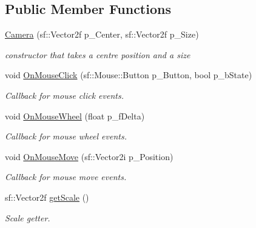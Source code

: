 \subsection*{Public Member Functions}
\begin{DoxyCompactItemize}
\item 
\mbox{\label{class_camera_a0c1efce0a93d56215af15a6bc88f360f}} 
\hyperlink{class_camera_a0c1efce0a93d56215af15a6bc88f360f}{Camera} (sf\+::\+Vector2f p\+\_\+\+Center, sf\+::\+Vector2f p\+\_\+\+Size)
\begin{DoxyCompactList}\small\item\em constructor that takes a centre position and a size \end{DoxyCompactList}\item 
\mbox{\label{class_camera_a58eedba9725c44625b3e983221aaf444}} 
void \hyperlink{class_camera_a58eedba9725c44625b3e983221aaf444}{On\+Mouse\+Click} (sf\+::\+Mouse\+::\+Button p\+\_\+\+Button, bool p\+\_\+b\+State)
\begin{DoxyCompactList}\small\item\em Callback for mouse click events. \end{DoxyCompactList}\item 
\mbox{\label{class_camera_a43f67138a331c8fe5d5fc144b47c0a41}} 
void \hyperlink{class_camera_a43f67138a331c8fe5d5fc144b47c0a41}{On\+Mouse\+Wheel} (float p\+\_\+f\+Delta)
\begin{DoxyCompactList}\small\item\em Callback for mouse wheel events. \end{DoxyCompactList}\item 
\mbox{\label{class_camera_adf59388a392cf0195b3b1076d9fd27dd}} 
void \hyperlink{class_camera_adf59388a392cf0195b3b1076d9fd27dd}{On\+Mouse\+Move} (sf\+::\+Vector2i p\+\_\+\+Position)
\begin{DoxyCompactList}\small\item\em Callback for mouse move events. \end{DoxyCompactList}\item 
\mbox{\label{class_camera_ab6170a0b0ed8ef476d658fc18cf1c96b}} 
sf\+::\+Vector2f \hyperlink{class_camera_ab6170a0b0ed8ef476d658fc18cf1c96b}{get\+Scale} ()
\begin{DoxyCompactList}\small\item\em Scale getter. \end{DoxyCompactList}\end{DoxyCompactItemize}


